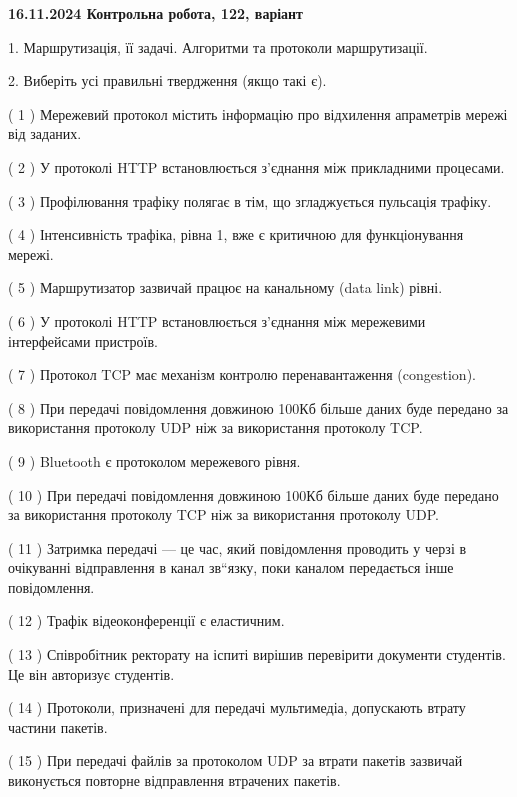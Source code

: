 \documentclass[12pt, ukrainian]{article}
\begin{document}
\vspace{4mm}
\newpage
\begin {large}

\textbf{16.11.2024 Контрольна робота, 122, варіант  }\par


{
1. Маршрутизація, її задачі. Алгоритми та протоколи маршрутизації.



\vspace{5mm}
2. Виберіть усі правильні твердження (якщо такі є).\par
\vspace{2mm}

( 1 ) Мережевий протокол містить інформацію про відхилення апраметрів мережі від заданих.

( 2 ) У протоколі HTTP встановлюється з'єднання між прикладними процесами.

( 3 ) Профілювання трафіку полягає в тім, що згладжується пульсація трафіку.

( 4 ) Інтенсивність трафіка, рівна 1, вже є критичною для функціонування мережі.

( 5 ) Маршрутизатор зазвичай працює на канальному (data link) рівні.

( 6 ) У протоколі HTTP встановлюється з'єднання між мережевими інтерфейсами пристроїв.

( 7 ) Протокол TCP має механізм контролю перенавантаження (congestion).

( 8 ) При передачі повідомлення довжиною 100Кб більше даних буде передано за використання протоколу UDP ніж за використання протоколу TCP.

( 9 ) Bluetooth є протоколом мережевого рівня.

( 10 ) При передачі повідомлення довжиною 100Кб більше даних буде передано за використання протоколу TCP ніж за використання протоколу UDP.

( 11 ) Затримка передачі — це час, який повідомлення проводить у черзі в очікуванні відправлення в канал зв“язку, поки каналом передається інше повідомлення.

( 12 ) Трафік відеоконференції є еластичним.

( 13 ) Співробітник ректорату на іспиті вирішив перевірити документи студентів. Це він авторизує студентів.

( 14 ) Протоколи, призначені для передачі мультимедіа, допускають втрату частини пакетів.

( 15 ) При передачі файлів за протоколом UDP за втрати пакетів зазвичай виконується повторне відправлення втрачених пакетів.
}
\end {large}
\end{document}
